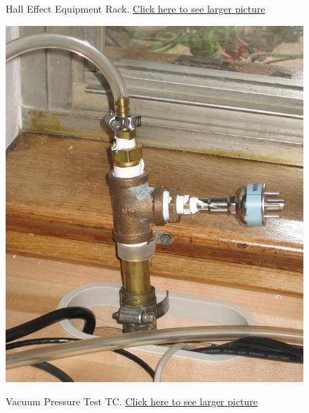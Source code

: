 \documentclass{../lab}
\begin{document}
\begin{figure}[H]
  \caption{Hall Effect Equipment Rack.  \href{http://experimentationlab.berkeley.edu/sites/default/files/images/HAL_0153B.jpg}{Click here to see larger picture}}
  \label{fig:HAL_0153B.jpg}
\endminipage\hfill
{}
  \href{http://experimentationlab.berkeley.edu/sites/default/files/images/HAL_TC_Gauge_3533-Lg.jpg}{\includegraphics[width=\linewidth,keepaspectratio]{images/HAL_TC_Gauge_3533-Lg.jpg}}
  \caption{Vacuum Pressure Test TC.  \href{http://experimentationlab.berkeley.edu/sites/default/files/images/HAL_TC_Gauge_3533-Lg.jpg}{Click here to see larger picture}}\label{fig:HAL_TC_Gauge_3533-Lg.jpg}
\endminipage
\end{figure}
\end{document}
